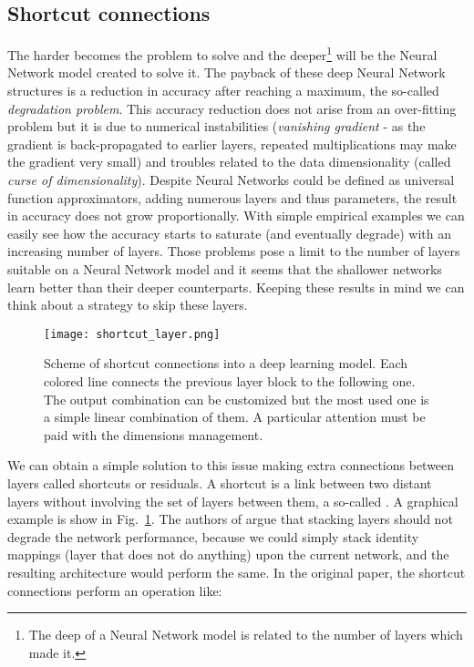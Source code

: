 \documentclass{standalone}
\begin{document}
\subsection[Shortcut]{Shortcut connections}\label{NN:shortcut}

The harder becomes the problem to solve and the deeper\footnote{
  The deep of a Neural Network model is related to the number of layers which made it.
} will be the Neural Network model created to solve it.
The payback of these deep Neural Network structures is a reduction in accuracy after reaching a maximum, the so-called \emph{degradation problem}.
This accuracy reduction does not arise from an over-fitting problem but it is due to numerical instabilities (\emph{vanishing gradient} - as the gradient is back-propagated to earlier layers, repeated multiplications may make the gradient very small) and troubles related to the data dimensionality (called \emph{curse of dimensionality}).
Despite Neural Networks could be defined as universal function approximators, adding numerous layers and thus parameters, the result in accuracy does not grow proportionally.
With simple empirical examples we can easily see how the accuracy starts to saturate (and eventually degrade) with an increasing number of layers.
Those problems pose a limit to the number of layers suitable on a Neural Network model and it seems that the shallower networks learn better than their deeper counterparts.
Keeping these results in mind we can think about a strategy to skip these  layers.

\begin{center}
\begin{figure}[htbp]
\centering
\texttt{[image: shortcut\_layer.png]}
\caption{Scheme of shortcut connections into a deep learning model.
Each colored line connects the previous layer block to the following one.
The output combination can be customized but the most used one is a simple linear combination of them.
A particular attention must be paid with the dimensions management.
}
\label{fig:shortcut}
\end{figure}
\end{center}

We can obtain a simple solution to this issue making extra connections between layers called shortcuts or residuals.
A shortcut is a link between two distant layers without involving the set of layers between them, a so-called .
A graphical example is show in Fig.~\ref{fig:shortcut}.
The authors of \cite{he2015deep} argue that stacking layers should not degrade the network performance, because we could simply stack identity mappings (layer that does not do anything) upon the current network, and the resulting architecture would perform the same.
In the original paper, the shortcut connections perform an operation like:
\end{document}
